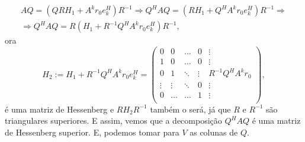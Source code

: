 \begin{multline}
AQ=(QRH_1+A^kr_0e_k^H)R^{-1}\Rightarrow Q^HAQ=(RH_1+Q^HA^kr_0e_k^H)R^{-1}\Rightarrow\\
\Rightarrow Q^HAQ=R(H_1+R^{-1}Q^HA^kr_0e_k^H)R^{-1}\label{eq:vuik2},
\end{multline}
ora
\[H_2:=H_1+R^{-1}Q^HA^kr_0e_k^H=\begin{pmatrix}
    0 & 0 & \ldots & 0 & \vdots \\
     1 & 0 & \ldots & 0 & \vdots  \\
     0 & 1& \ddots & \vdots & R^{-1}Q^HA^kr_0 \\
     \vdots & \vdots & \ddots & 0 & \vdots\\
     0 & \ldots & \ldots & 1 & \vdots \\
     \end{pmatrix},\]
     é uma matriz de Hessenberg e $RH_2R^{-1}$ também o será, já que  $R$ e $R^{-1}$ são triangulares superiores. E assim, vemos que a decomposição $Q^HAQ$ é uma matriz de Hessenberg superior. E, podemos tomar para $V$ as colunas de $Q$.

